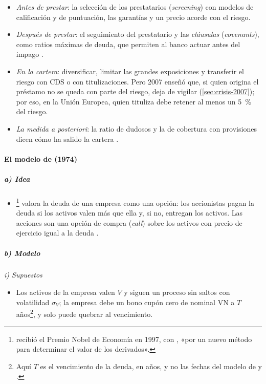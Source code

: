 \documentclass[11pt]{article}
\begin{document}
\begin{itemize}
\item \emph{Antes de prestar}: la selección de los prestatarios (\emph{screening}) con modelos de calificación y de puntuación\nocite{Altman1968}, las garantías y un precio acorde con el riesgo.
\item \emph{Después de prestar}: el seguimiento del prestatario y las \emph{cláusulas} (\emph{covenants}), como ratios máximas de deuda, que permiten al banco actuar antes del impago .
\item \emph{En la cartera}: diversificar, limitar las grandes exposiciones y transferir el riesgo con CDS o con titulizaciones. Pero 2007 enseñó que, si quien origina el préstamo no se queda con parte del riesgo, deja de vigilar (\ref{sec:crisis-2007}); por eso, en la Unión Europea, quien tituliza debe retener al menos un 5~\% del riesgo\nocite{UE2017Titulizacion}.
\item \emph{La medida a posteriori}: la ratio de dudosos y la de cobertura con provisiones dicen cómo ha salido la cartera .
\end{itemize}

\paragraph{El modelo de  (1974)}

\subparagraph{a) Idea}

\begin{itemize}
\item \textcite{Merton1974Pricing}\footnote{ recibió el Premio Nobel de Economía en 1997, con , «por un nuevo método para determinar el valor de los derivados»\nocite{Nobel1997Prensa}.} valora la deuda de una empresa como una opción: los accionistas pagan la deuda si los activos valen más que ella y, si no, entregan los activos. Las acciones son una opción de compra (\emph{call}) sobre los activos con precio de ejercicio igual a la deuda .
\end{itemize}

\subparagraph{b) Modelo}

\hspace*{3.6em}\emph{i) Supuestos}

\begin{itemize}
\item Los activos de la empresa valen $V$ y siguen un proceso sin saltos con volatilidad $\sigma_V$; la empresa debe un bono cupón cero de nominal VN a $T$ años\footnote{Aquí $T$ es el vencimiento de la deuda, en años, y no las fechas del modelo de  y .}, y solo puede quebrar al vencimiento.
\end{itemize}
\end{document}
